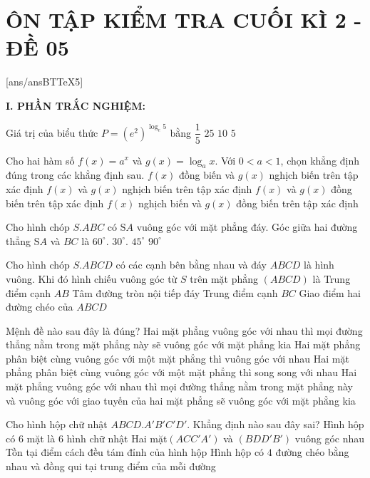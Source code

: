 \section*{ÔN TẬP KIỂM TRA CUỐI KÌ 2 - ĐỀ 05}
\setcounter{ex}{0}\setcounter{bt}{0}
[ans/ansBTTeX5]

\noindent\textbf{I. PHẦN TRẮC NGHIỆM:}
\begin{ex}
Giá trị của biểu thức $P=\left(e^2\right)^{\log _e5}$ bằng
\choice
{$\dfrac{1}{5}$}
{$25$}
{$10$}
{$5$}
\end{ex}
\begin{ex}
Cho hai hàm số $f(x)=a^x$ và $g(x)=\log _ax$. Với $0<a<1$, chọn khẳng định đúng trong các khẳng định sau.
\choice
{$f(x)$ đồng biến và $g(x)$ nghịch biến trên tập xác định}
{$f(x)$ và $g(x)$ nghịch biến trên tập xác định}
{$f(x)$ và $g(x)$ đồng biến trên tập xác định}
{$f(x)$ nghịch biến và $g(x)$ đồng biến trên tập xác định}
\end{ex}
\begin{ex}
Cho hình chóp $S.ABC$ có $\text{S}A$ vuông góc với mặt phẳng đáy. Góc giữa hai đường thẳng $\text{S}A$ và $BC$ là
\choice
{$60^\circ $.}
{$30^\circ $.}
{$45^\circ $}
{$90^\circ $}
\end{ex}
\begin{ex}
Cho hình chóp $S.ABCD$ có các cạnh bên bằng nhau và đáy $ABCD$ là hình vuông. Khi đó hình chiếu vuông góc từ $S$ trên mặt phẳng $\left(ABCD\right)$ là
\choice
{Trung điểm cạnh $AB$}
{Tâm đường tròn nội tiếp đáy}
{Trung điểm cạnh $BC$}
{Giao điểm hai đường chéo của $ABCD$}
\end{ex}
\begin{ex}
Mệnh đề nào sau đây là đúng?
\choice
{Hai mặt phẳng vuông góc với nhau thì mọi đường thẳng nằm trong mặt phẳng này sẽ
vuông góc với mặt phẳng kia}
{Hai mặt phẳng phân biệt cùng vuông góc với một mặt phẳng thì vuông góc với nhau}
{Hai mặt phẳng phân biệt cùng vuông góc với một mặt phẳng thì song song với nhau}
{Hai mặt phẳng vuông góc với nhau thì mọi đường thẳng nằm trong mặt phẳng này và
vuông góc với giao tuyến của hai mặt phẳng sẽ vuông góc với mặt phẳng kia}
\end{ex}
\begin{ex}
Cho hình hộp chữ nhật $ABCD.A'B'C'D'$. Khẳng định nào sau đây sai?
\choice
{Hình hộp có $6$ mặt là $6$ hình chữ nhật}
{Hai mặt$\left(ACC'A'\right)$ và $\left(BDD'B'\right)$ vuông góc nhau}
{Tồn tại điểm cách đều tám đỉnh của hình hộp}
{Hình hộp có $4$ đường chéo bằng nhau và đồng qui tại trung điểm của mỗi đường}
\end{ex}

